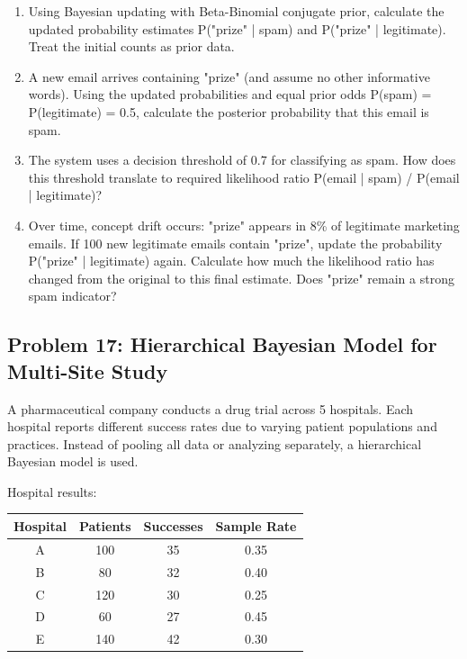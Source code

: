\documentclass[12pt]{article}
\begin{document}
\begin{enumerate}[label=(\alph*)]
\item Using Bayesian updating with Beta-Binomial conjugate prior, calculate the updated probability estimates P("prize" | spam) and P("prize" | legitimate). Treat the initial counts as prior data.

\item A new email arrives containing "prize" (and assume no other informative words). Using the updated probabilities and equal prior odds P(spam) = P(legitimate) = 0.5, calculate the posterior probability that this email is spam.

\item The system uses a decision threshold of 0.7 for classifying as spam. How does this threshold translate to required likelihood ratio P(email | spam) / P(email | legitimate)?

\item Over time, concept drift occurs: "prize" appears in 8\% of legitimate marketing emails. If 100 new legitimate emails contain "prize", update the probability P("prize" | legitimate) again. Calculate how much the likelihood ratio has changed from the original to this final estimate. Does "prize" remain a strong spam indicator?
\end{enumerate}

\subsection*{Problem 17: Hierarchical Bayesian Model for Multi-Site Study}

A pharmaceutical company conducts a drug trial across 5 hospitals. Each hospital reports different success rates due to varying patient populations and practices. Instead of pooling all data or analyzing separately, a hierarchical Bayesian model is used.

Hospital results:
\begin{center}
\begin{tabular}{cccc}
\toprule
Hospital & Patients & Successes & Sample Rate \\
\midrule
A & 100 & 35 & 0.35 \\
B & 80 & 32 & 0.40 \\
C & 120 & 30 & 0.25 \\
D & 60 & 27 & 0.45 \\
E & 140 & 42 & 0.30 \\
\bottomrule
\end{tabular}
\end{center}
\end{document}
